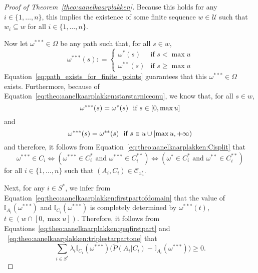 \documentclass[10pt,a4paper]{paper}
\theoremstyle{definition}
\newcommand{\ind}[1]{\mathbb{I}_{#1}}
\newcommand{\coloneqq}{:\!=}
\begin{document}
\begin{proof}[Proof of Theorem~\ref{theo:aanelkaarplakken}]
Because this holds for any $i\in\{1,\ldots,n\}$, this implies the existence of some finite sequence $w\in\mathcal{U}$ such that $w_i\subseteq w$ for all $i\in\{1,\ldots,n\}$.

Now let $\omega^{***}\in\Omega$ be any path such that, for all $s\in w$,
\begin{equation*}%
\omega^{***}(s)\coloneqq
\begin{cases}
\omega^{*}(s) & \text{if $s<\max u$}\\
\omega^{**}(s) & \text{if $s\geq \max u$}
\end{cases}
\end{equation*}
Equation~\eqref{eq:path_exists_for_finite_points} guarantees that this $\omega^{***}\in\Omega$ exists. Furthermore, because of Equation~\eqref{eq:theo:aanelkaarplakken:starstarniceonu}, we know that, for all $s\in w$,
\begin{equation}\label{eq:theo:aanelkaarplakken:triplestarpartone}
\omega^{***}(s)=\omega^*(s)
\text{~~if $s\in [0,\max u]$}\vspace{-3mm}
\end{equation}
and
\begin{equation}\label{eq:theo:aanelkaarplakken:triplestarparttwo}
\omega^{***}(s)=\omega^{**}(s)
\text{~~if $s\in u\cup [\max u,+\infty)$}
\vspace{2mm}
\end{equation}
and therefore, it follows from Equation~\eqref{eq:theo:aanelkaarplakken:Cisplit} that
\begin{equation}\label{eq:theo:aanelkaarplakken:triplestarequivalence}
\omega^{***}\in C_i
\Leftrightarrow
(\omega^{***}\in C_i^*
\text{~and~}
\omega^{***}\in C_i^{**})
\Leftrightarrow
(\omega^{*}\in C_i^*
\text{~and~}
\omega^{**}\in C_i^{**})
\end{equation}
for all $i\in\{1,\dots,n\}$ such that $(A_i,C_i)\in\mathcal{C}_{x_u^*}$.


Next, for any $i\in S^*$, we infer from Equation~\eqref{eq:theo:aanelkaarplakken:firstpartofdomain} that the value of $\ind{A_i}(\omega^{***})$ and $\ind{C_i}(\omega^{***})$ is completely determined by $\omega^{***}(t)$, $t\in(w\cap[0,\max u])$. Therefore, it follows from Equations~\eqref{eq:theo:aanelkaarplakken:geqfirstpart} and ~\eqref{eq:theo:aanelkaarplakken:triplestarpartone} that 
\begin{equation}\label{eq:theo:aanelkaarplakken:geqfirstparttriplestar}
\sum_{i\in S^*}\lambda_i\ind{C_i}(\omega^{***})\bigl(\tilde{P}(A_i\vert C_i)-\ind{A_i}(\omega^{***})\bigr)
\geq0.
\end{equation}


\end{proof}
\end{document}
